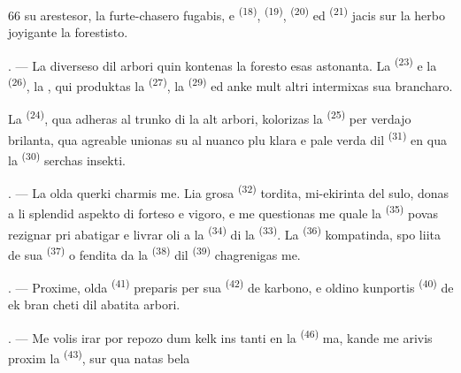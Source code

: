 \begin{VUpage}[68]{66}
\VUcontinue
su arestesor, la furte-chasero fugabis, e \cc
{} \textsuperscript{(18)},  \textsuperscript{(19)},  \textsuperscript{(20)} ed  \textsuperscript{(21)}\nl
jacis sur la herbo joyigante la forestisto.

. --- La diverseso dil arbori quin kontenas\nl
la foresto esas astonanta. La  \textsuperscript{(23)} e la \cc
{} \textsuperscript{(26)}, la , qui produktas la  \textsuperscript{(27)}, la\nl
{} \textsuperscript{(29)} ed anke mult altri intermixas sua\nl
brancharo.

\VUblancAlinea
La  \textsuperscript{(24)}, qua adheras al trunko di la\nl
alt arbori, kolorizas la  \textsuperscript{(25)} per verdajo\nl
brilanta, qua agreable unionas su al nuanco\nl
plu klara e pale verda dil  \textsuperscript{(31)} en qua la\nl
{} \textsuperscript{(30)} serchas insekti.

\VUsaut{3.0mm}
\VUsaut{3.0mm}

. --- La olda querki charmis me. Lia grosa\nl
{} \textsuperscript{(32)} tordita, mi-ekirinta del sulo, donas\nl
a li splendid aspekto di forteso e vigoro, e me\nl
questionas me quale la  \textsuperscript{(35)} povas\nl
rezignar pri abatigar e livrar oli a la  \textsuperscript{(34)}\nl
di la  \textsuperscript{(33)}. La  \textsuperscript{(36)} kompatinda, spo\cc
liita de sua  \textsuperscript{(37)} o fendita da la  \textsuperscript{(38)}\nl
dil  \textsuperscript{(39)} chagrenigas me.

. --- Proxime, olda  \textsuperscript{(41)} preparis\nl
per sua  \textsuperscript{(42)} de karbono, e oldino\nl
kunportis  \textsuperscript{(40)} de  ek bran\cc
cheti dil abatita arbori.

\VUsaut{3.0mm}
\VUsaut{3.0mm}

. --- Me volis irar por repozo dum kelk ins\cc
tanti en la  \textsuperscript{(46)} ma, kande me\nl
arivis proxim la  \textsuperscript{(43)}, sur qua natas bela
\parplein
\end{VUpage}

